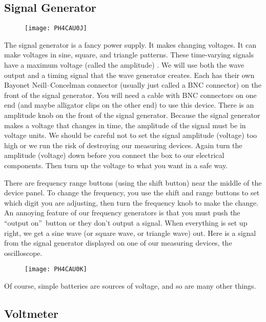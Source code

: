 \subsection{Signal Generator}

\begin{figure}[h!]
\texttt{[image: PH4CAU0J]}
\end{figure}The signal generator is a fancy
power supply. It makes changing voltages. It can make voltages in sine,
square, and triangle patterns. These time-varying signals have a maximum
voltage (called the amplitude) . We will use both the wave output and a
timing signal that the wave generator creates. Each has their own Bayonet
Neill--Concelman connector (usually just called a BNC connector) on the
front of the signal generator. You will need a cable with BNC connectors on
one end (and maybe alligator clips on the other end) to use this device.
There is an amplitude knob on the front of the signal generator. Because the
signal generator makes a voltage that changes in time, the amplitude of the
signal must be in voltage units. We should be careful not to set the signal
amplitude (voltage) too high or we run the risk of destroying our measuring
devices. Again turn the amplitude (voltage) down before you connect the box
to our electrical components. Then turn up the voltage to what you want in a
safe way.

There are frequency range buttons (using the shift button) near the middle
of the device panel. To change the frequency, you use the shift and range
buttons to set which digit you are adjusting, then turn the frequency knob
to make the change. An annoying feature of our frequency generators is that
you must push the \textquotedblleft output on\textquotedblright\ button or
they don't output a signal. When everything is set up right, we get a sine
wave (or square wave, or triangle wave) out. Here is a signal from the
signal generator displayed on one of our measuring devices, the
oscilloscope. \begin{figure}[h!]
\texttt{[image: PH4CAU0K]}
\end{figure}

Of course, simple batteries are sources of voltage, and so are many other
things.

\subsection{Voltmeter}

